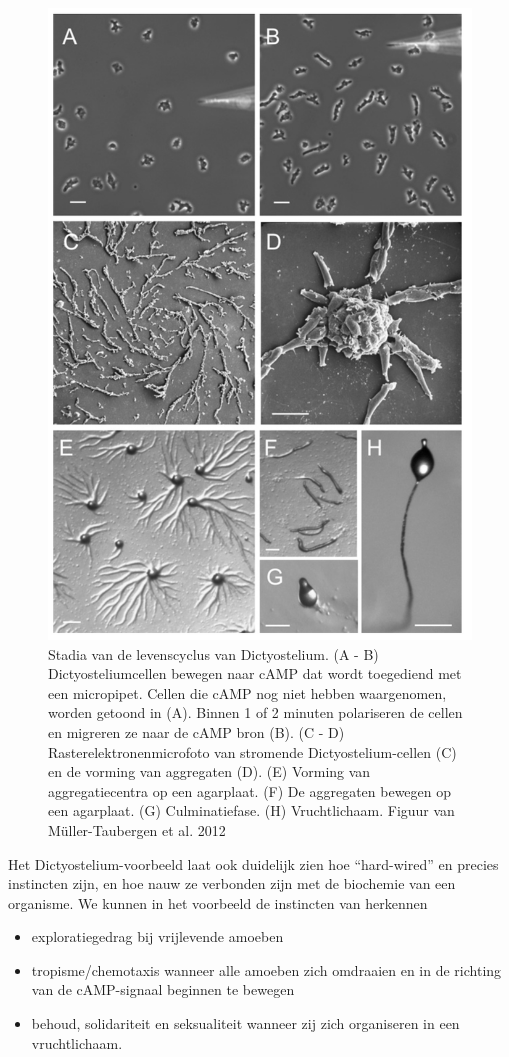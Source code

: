 \documentclass[
  11pt,
]{book}
\providecommand{\tightlist}{%
  \setlength{\itemsep}{0pt}\setlength{\parskip}{0pt}}
\begin{document}
\pagebreak

\begin{figure}

{\centering \includegraphics[width=0.6\linewidth]{./figs/Dictyostelida} 

}

\caption{Stadia van de levenscyclus van Dictyostelium. (A - B) Dictyosteliumcellen bewegen naar cAMP dat wordt toegediend met een micropipet. Cellen die cAMP nog niet hebben waargenomen, worden getoond in (A). Binnen 1 of 2 minuten polariseren de cellen en migreren ze naar de cAMP bron (B). (C - D) Rasterelektronenmicrofoto van stromende Dictyostelium-cellen (C) en de vorming van aggregaten (D). (E) Vorming van aggregatiecentra op een agarplaat. (F) De aggregaten bewegen op een agarplaat. (G) Culminatiefase. (H) Vruchtlichaam. Figuur van Müller-Taubergen et al. 2012}\label{fig:Dictyostelium}
\end{figure}

Het Dictyostelium-voorbeeld laat ook duidelijk zien hoe ``hard-wired'' en precies instincten zijn, en hoe nauw ze verbonden zijn met de biochemie van een organisme. We kunnen in het voorbeeld de instincten van herkennen

\begin{itemize}
\tightlist
\item
  exploratiegedrag bij vrijlevende amoeben
\item
  tropisme/chemotaxis wanneer alle amoeben zich omdraaien en in de richting van de cAMP-signaal beginnen te bewegen
\item
  behoud, solidariteit en seksualiteit wanneer zij zich organiseren in een vruchtlichaam.
\end{itemize}
\end{document}
